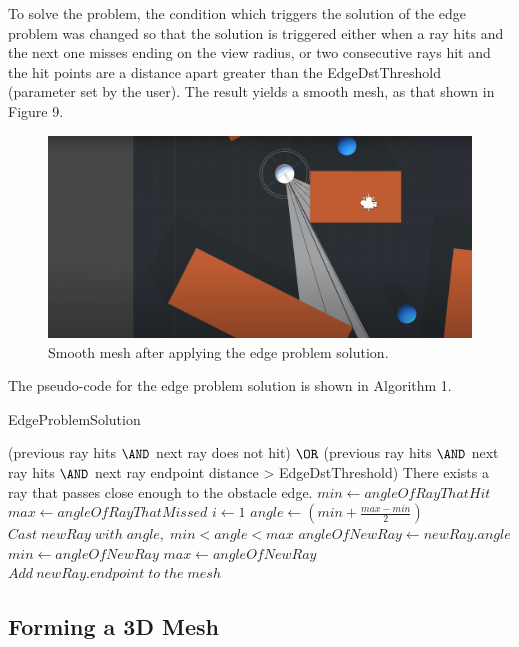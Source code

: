 \documentclass{article}
\begin{document}
To solve the problem, the condition which triggers the solution of the edge problem was changed so that the solution is triggered either when a ray hits and the next one misses ending on the view radius, or two consecutive rays hit and the hit points are a distance apart greater than the EdgeDstThreshold (parameter set by the user). The result yields a smooth mesh, as that shown in Figure 9.

\begin{figure} %
	\centering
	\includegraphics[width=1\columnwidth]{FOV(10).png} %
	\caption{Smooth mesh after applying the edge problem solution.}
\end{figure}

The pseudo-code for the edge problem solution is shown in Algorithm 1.

\begin{algorithm}
\caption{EdgeProblemSolution}
\begin{algorithmic} 
\REQUIRE (previous ray hits $ \AND $  next ray does not hit) $ \OR $ (previous ray hits $ \AND $ next ray hits $ \AND $ next ray endpoint distance > EdgeDstThreshold)
\ENSURE There exists a ray that passes close enough to the obstacle edge.
\STATE $min \leftarrow angleOfRayThatHit$
\STATE $max \leftarrow angleOfRayThatMissed$
\STATE $i \leftarrow 1$
\STATE $ angle \leftarrow (min + \frac{max-min}{2}) $
\STATE $ Cast\; newRay\; with\; angle,\; min < angle < max$
\STATE $angleOfNewRay \leftarrow newRay.angle$
\STATE $min \leftarrow angleOfNewRay$
\ELSE
\STATE $max \leftarrow angleOfNewRay$
\ENDIF
\ENDWHILE
\STATE $ Add\: newRay.endpoint\; to\; the\; mesh $
\end{algorithmic}
\end{algorithm}

\subsection{Forming a 3D Mesh}
\end{document}
